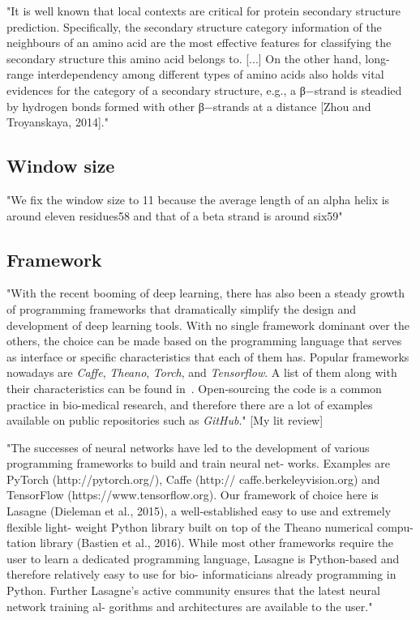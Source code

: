 "It is well known that local contexts are critical for protein secondary structure prediction. Specifically, the secondary structure category information of the neighbours of an amino acid are the most effective features for classifying the secondary structure this amino acid belongs to. [...] On the other hand, long-range interdependency among different types of amino acids also holds vital evidences for the category of a secondary structure, e.g., a β−strand is steadied by hydrogen bonds formed with other β−strands at a distance [Zhou and Troyanskaya, 2014]." \cite{Li2016}

\subsection{Window size}
"We fix the window size to 11 because the average length of an alpha helix is around eleven residues58 and that of a beta strand is around six59" \cite{Wang2016}

\subsection{Framework}
"With the recent booming of deep learning, there has also been a steady growth of programming frameworks that dramatically simplify the design and development of deep learning tools. With no single framework dominant over the others, the choice can be made based on the programming language that serves as interface or specific characteristics that each of them has. Popular frameworks nowadays are \textit{Caffe}, \textit{Theano}, \textit{Torch}, and \textit{Tensorflow}. A list of them along with their characteristics can be found in~\cite{Ravi2017}. Open-sourcing the code is a common practice in bio-medical research, and therefore there are a lot of examples available on public repositories such as \textit{GitHub}." [My lit review]

"The successes of neural networks have led to the development of various programming frameworks to build and train neural net- works. Examples are PyTorch (http://pytorch.org/), Caffe (http:// caffe.berkeleyvision.org) and TensorFlow (https://www.tensorflow.org). Our framework of choice here is Lasagne (Dieleman et al., 2015), a well-established easy to use and extremely flexible light- weight Python library built on top of the Theano numerical compu- tation library (Bastien et al., 2016). While most other frameworks require the user to learn a dedicated programming language, Lasagne is Python-based and therefore relatively easy to use for bio- informaticians already programming in Python. Further Lasagne’s active community ensures that the latest neural network training al- gorithms and architectures are available to the user." \cite{Jurtz2017}

